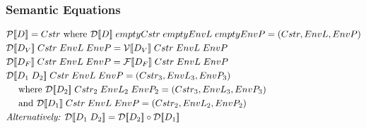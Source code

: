 \subsubsection{Semantic Equations}
\begin{align*}
& \iP\dblSq{D} = Cstr \text{ where } \iD\dblSq{D} \; emptyCstr \; emptyEnvL \; emptyEnvP = (Cstr, EnvL, EnvP) \\
& \iD\dblSq{D_V} \; Cstr \; EnvL \; EnvP = \iV\dblSq{D_V} \; Cstr \; EnvL \; EnvP \\
& \iD\dblSq{D_F} \; Cstr \; EnvL \; EnvP = \iF\dblSq{D_F} \; Cstr \; EnvL \; EnvP \\
& \iD\dblSq{D_1 \; D_2} \; Cstr \; EnvL \; EnvP = (Cstr_3, EnvL_3, EnvP_3) \\
& \quad \text{ where } \iD\dblSq{D_2} \; Cstr_2 \; EnvL_2 \; EnvP_2  = (Cstr_3, EnvL_3, EnvP_3) \\
& \quad \text{ and } \iD\dblSq{D_1} \; Cstr \; EnvL \; EnvP = (Cstr_2, EnvL_2, EnvP_2) \\
& \textit{Alternatively: } \iD\dblSq{D_1 \; D_2} = \iD\dblSq{D_2} \circ \iD\dblSq{D_1}
\end{align*}
